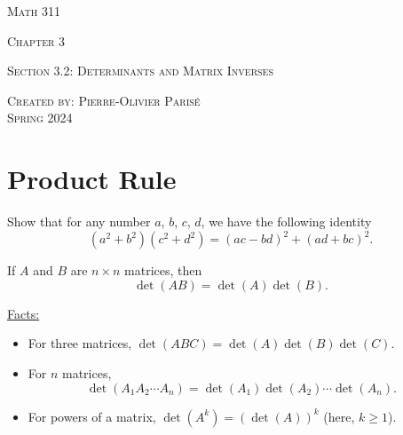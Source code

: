 \documentclass[20pt,a4paper]{extarticle}
\newcounter{example}
\newcounter{theorem}
\begin{document}
\thispagestyle{empty}

\begin{center}
\vspace*{0.75cm}

{\Huge \textsc{Math 311}}

\vspace*{1.5cm}

{\LARGE \textsc{Chapter 3}} 

\vspace*{0.75cm}

\noindent\textsc{Section 3.2: Determinants and Matrix Inverses}

\vspace*{0.25cm}

\tableofcontents

\vfill

\noindent \textsc{Created by: Pierre-Olivier Paris{\'e}} \\
\textsc{Spring 2024}
\end{center}

\newpage

\section{Product Rule}

\begin{example}
Show that for any number $a$, $b$, $c$, $d$, we have the following identity
	\[
		(a^2 + b^2) (c^2 + d^2) = (ac - bd)^2 + (ad + bc)^2 .
	\]
\end{example}

\begin{solution}

\end{solution}

\newpage 


\begin{theorem}
If $A$ and $B$ are $n \times n$ matrices, then
	\[
		\det (AB) = \det (A) \det (B) .
	\]
\end{theorem}

\underline{Facts:}
	\begin{itemize}
		\item For three matrices, $\det (ABC) = \det (A) \det (B) \det (C)$.
		\item For $n$ matrices, 
			$$ 
				\det (A_1 A_2 \cdots A_n) = \det (A_1) \det (A_2) \cdots \det (A_n) .
			$$
		\item For powers of a matrix, $\det (A^k) = (\det (A))^k$ (here, $k \geq 1$).
	\end{itemize}
\end{document}
